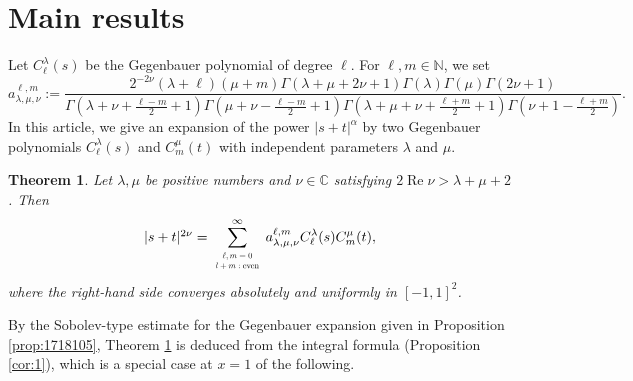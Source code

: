 \documentclass[12pt]{article}
\newcommand{\myabs}[1]{\left|#1\right|}
\newcommand{\N}{\mathbb{N}}
\newcommand{\C}{\mathbb{C}}
\renewcommand{\Re}{\operatorname{Re}}
\numberwithin{equation}{section}
\newcommand{\assign}{:=}
\newcommand{\tmop}[1]{\ensuremath{\operatorname{#1}}}
\newtheorem{theorem}[corollary]{Theorem}
\begin{document}
\section{Main results}
Let $C_{\ell}^{\lambda} (s)$ be the Gegenbauer polynomial of degree $\ell$. For $\ell,m\in\N$, we set
\begin{equation*}
     \displaystyle a_{\lambda, \mu, \nu}^{\ell, m} \assign\displaystyle \frac{2^{- 2 \nu} (\lambda + \ell)
    (\mu + m) \Gamma (\lambda + \mu + 2 \nu + 1) \Gamma (\lambda) \Gamma (\mu)
    \Gamma (2 \nu + 1)}{\Gamma \left( \lambda + \nu + \frac{\ell - m}{2} + 1
    \right) \Gamma \left( \mu + \nu - \frac{\ell - m}{2} + 1 \right) \Gamma
    \left( \lambda + \mu + \nu + \frac{\ell + m}{2} + 1 \right) \Gamma \left(
    \nu + 1 - \frac{\ell + m}{2} \right)} .
\end{equation*}
In this article, we give an expansion of the power $\myabs{s+t}^\alpha$ by two Gegenbauer polynomials $C^\lambda_\ell(s)$ and $C^\mu_m(t)$ with independent parameters $\lambda$ and $\mu$.
\begin{theorem}
	\label{thm:1-1}
	Let $\lambda,\mu$ be positive numbers and $\nu\in\C$ satisfying $2\Re \nu>\lambda+\mu+2$. Then
  \begin{equation*}
	  \begin{array}[]{c}
		  | s + t |^{2 \nu} = \displaystyle\sum_{\scalebox{0.6}{$\begin{array}[]{c}
			  \ell,m=0\\
			  l+m:\tmop{even}
		  \end{array}$}}^{\infty} a_{\lambda, \mu, \nu}^{\ell, m} C_{\ell}^{\lambda}
    (s) C_m^{\mu} (t), \\
	  \end{array}
  \end{equation*}
  where the right-hand side converges absolutely and uniformly in $[-1,1]^2$.
\end{theorem}
By the Sobolev-type estimate for the Gegenbauer expansion given in Proposition \ref{prop:1718105},
Theorem \ref{thm:1-1} is deduced from the integral formula (Proposition \ref{cor:1}),
which is a special case at $x=1$ of the following.
\end{document}
